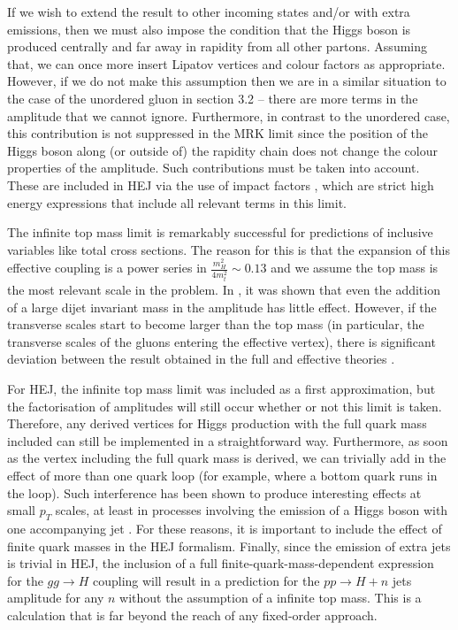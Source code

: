 If we wish to extend the result to other incoming states and/or with extra emissions, then we must also impose the condition that the Higgs boson is produced centrally and far away in rapidity from all other partons. Assuming that, we can once more insert Lipatov vertices and colour factors as appropriate. However, if we do not make this assumption then we are in a similar situation to the case of the unordered gluon in section 3.2 -- there are more terms in the amplitude that we cannot ignore. Furthermore, in contrast to the unordered case, this contribution is not suppressed in the MRK limit since the position of the Higgs boson along (or outside of) the rapidity chain does not change the colour properties of the amplitude. Such contributions must be taken into account. These are included in HEJ via the use of impact factors \cite{Duca2003}, which are strict high energy expressions that include all relevant terms in this limit.   

The infinite top mass limit is remarkably successful for predictions of inclusive variables like total cross sections. The reason for this is that the expansion of this effective coupling is a power series in $\frac{m_H^2}{4 m_t^2} \sim 0.13$ and we assume the top mass is the most relevant scale in the problem. In \cite{Duca2003}, it was shown that even the addition of a large dijet invariant mass in the amplitude has little effect. However, if the transverse scales start to become larger than the top mass (in particular, the transverse scales of the gluons entering the effective vertex), there is significant deviation between the result obtained in the full and effective theories \cite{Duca2003}. 

For HEJ, the infinite top mass limit was included as a first approximation, but the factorisation of amplitudes will still occur whether or not this limit is taken. Therefore, any derived vertices for Higgs production with the full quark mass included can still be implemented in a straightforward way. Furthermore, as soon as the vertex including the full quark mass is derived, we can trivially add in the effect of more than one quark loop (for example, where a bottom quark runs in the loop). Such interference has been shown to produce interesting effects at small $p_T$ scales, at least in processes involving the emission of a Higgs boson with one accompanying jet \cite{Grazzini2013, Lindert2017}. For these reasons, it is important to include the effect of finite quark masses in the HEJ formalism. Finally, since the emission of extra jets is trivial in HEJ, the inclusion of a full finite-quark-mass-dependent expression for the $gg \to H$ coupling will result in a prediction for the $pp \to H + n$ jets amplitude for any $n$ without the assumption of a infinite top mass. This is a calculation that is far beyond the reach of any fixed-order approach. 

